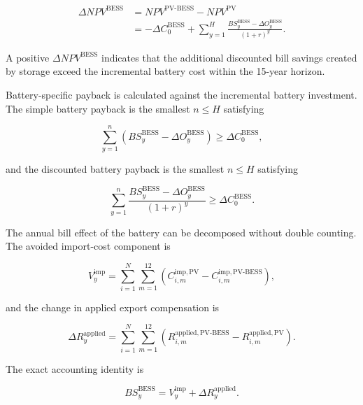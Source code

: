 \begin{align}
\Delta NPV^{\mathrm{BESS}}
&=NPV^{\mathrm{PV\mbox{-}BESS}}-NPV^{\mathrm{PV}} \nonumber\\
&=-\Delta C_0^{\mathrm{BESS}}
+\sum_{y=1}^{H}
\frac{BS_y^{\mathrm{BESS}}-\Delta O_y^{\mathrm{BESS}}}{(1+r)^y}.
\label{eq:ch5_incremental_bess_npv}
\end{align}

A positive $\Delta NPV^{\mathrm{BESS}}$ indicates that the additional discounted bill savings created by storage exceed the incremental battery cost within the 15-year horizon.

Battery-specific payback is calculated against the incremental battery investment. The simple battery payback is the smallest $n\leq H$ satisfying

\begin{equation}
\sum_{y=1}^{n}
\left(BS_y^{\mathrm{BESS}}-\Delta O_y^{\mathrm{BESS}}\right)
\geq \Delta C_0^{\mathrm{BESS}},
\label{eq:ch5_bess_simple_payback}
\end{equation}

and the discounted battery payback is the smallest $n\leq H$ satisfying

\begin{equation}
\sum_{y=1}^{n}
\frac{BS_y^{\mathrm{BESS}}-\Delta O_y^{\mathrm{BESS}}}{(1+r)^y}
\geq \Delta C_0^{\mathrm{BESS}}.
\label{eq:ch5_bess_discounted_payback}
\end{equation}

The annual bill effect of the battery can be decomposed without double counting. The avoided import-cost component is

\begin{equation}
V_y^{\mathrm{imp}}=
\sum_{i=1}^{N}\sum_{m=1}^{12}
\left(C_{i,m}^{\mathrm{imp,PV}}-C_{i,m}^{\mathrm{imp,PV\mbox{-}BESS}}\right),
\label{eq:ch5_avoided_import_value}
\end{equation}

and the change in applied export compensation is

\begin{equation}
\Delta R_y^{\mathrm{applied}}=
\sum_{i=1}^{N}\sum_{m=1}^{12}
\left(R_{i,m}^{\mathrm{applied,PV\mbox{-}BESS}}
-R_{i,m}^{\mathrm{applied,PV}}\right).
\label{eq:ch5_change_applied_export_credit}
\end{equation}

The exact accounting identity is

\begin{equation}
BS_y^{\mathrm{BESS}}=V_y^{\mathrm{imp}}+\Delta R_y^{\mathrm{applied}}.
\label{eq:ch5_bess_bill_identity}
\end{equation}

